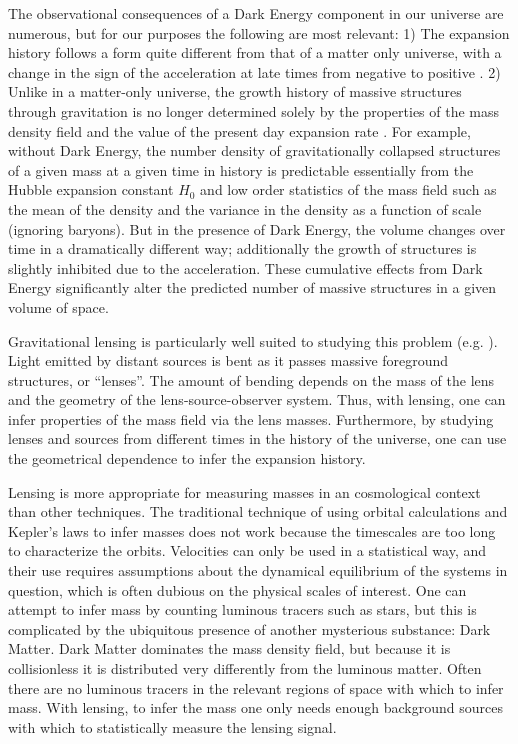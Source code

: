 \documentclass[12pt]{article}
\begin{document}
The observational consequences of a Dark Energy component in our universe are
numerous, but for our purposes the following are most relevant: 1) The
expansion history follows a form quite different from that of a matter only
universe, with a change in the sign of the acceleration at late times from
negative to positive \cite{Carroll92}.  2)  Unlike in a matter-only universe,
the growth history of massive structures through gravitation is no longer
determined solely by the properties of the mass density field and the value of
the present day expansion rate \cite{Haiman01}.  For example, without Dark
Energy, the number density of gravitationally collapsed structures of a given
mass at a given time in history is predictable essentially from the Hubble
expansion constant $H_0$ and low order statistics of the mass field such as the
mean of the density and the variance in the density as a function of scale
(ignoring baryons).  But in the presence of Dark Energy, the volume changes
over time in a dramatically different way; additionally the growth of
structures is slightly inhibited due to the acceleration.  These cumulative
effects from Dark Energy significantly alter the predicted number of massive
structures in a given volume of space.

Gravitational lensing is particularly well suited to studying this problem
(e.g. \cite{Kaiser98,Hu04}).  Light emitted by distant sources is bent as it
passes massive foreground structures, or ``lenses''.  The amount of bending
depends on the mass of the lens and the geometry of the lens-source-observer
system.  Thus, with lensing, one can infer properties of the mass field via the
lens masses. Furthermore, by studying lenses and sources from different times
in the history of the universe, one can use the geometrical dependence to infer
the expansion history.

Lensing is more appropriate for measuring masses in an cosmological context
than other techniques.  The traditional technique of using orbital calculations
and Kepler's laws to infer masses does not work because the timescales are too
long to characterize the orbits. Velocities can only be used in a statistical
way, and their use requires assumptions about the dynamical equilibrium of the
systems in question, which is often dubious on the physical scales of interest.
One can attempt to infer mass by counting luminous tracers such as stars, but
this is complicated by the ubiquitous presence of another mysterious substance:
Dark Matter.  Dark Matter dominates the mass density field, but because it is
collisionless it is distributed very differently from the luminous matter.
Often there are no luminous tracers in the relevant regions of space with which
to infer mass.  With lensing, to infer the mass one only needs enough
background sources with which to statistically measure the lensing signal.
\end{document}
